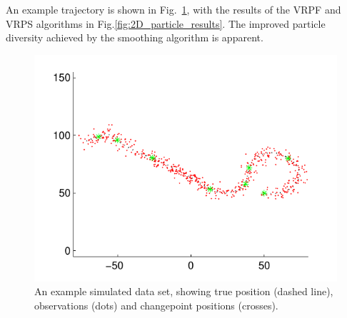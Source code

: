 \documentclass[journal]{IEEEtran}
\begin{document}
An example trajectory is shown in Fig.~\ref{fig:simulated_trajectory}, with the results of the VRPF and VRPS algorithms in Fig.\ref{fig:2D_particle_results}. The improved particle diversity achieved by the smoothing algorithm is apparent.

\begin{figure}[!t]
\centering
\includegraphics[width=0.9\columnwidth]{simulated_problem.pdf}
\caption{An example simulated data set, showing true position (dashed line), observations (dots) and changepoint positions (crosses). }
\label{fig:simulated_trajectory}
\end{figure}
\end{document}
